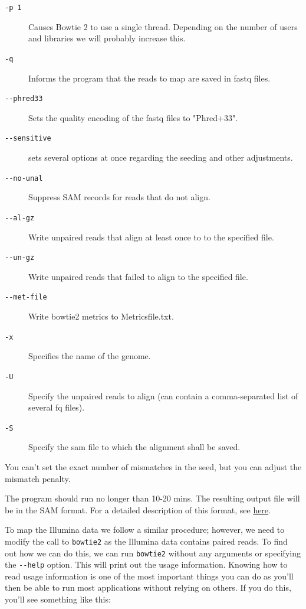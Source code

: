 \documentclass[11pt]{article}
\begin{document}
\begin{description}
\item[{\texttt{-p 1}}] Causes Bowtie 2 to use a single thread.
Depending on the number of users and libraries we will  probably increase this.
\item[{\texttt{-q}}] Informs the program that the reads to map are saved in fastq files.
\item[{\texttt{-{}-phred33}}] Sets the quality encoding of the fastq files to  "Phred+33".
\item[{\texttt{-{}-sensitive}}] sets several options at once regarding the seeding and other adjustments.
\item[{\texttt{-{}-no-unal}}] Suppress SAM records for reads that do not align.
\item[{\texttt{-{}-al-gz}}] Write unpaired reads that align at least once to to the specified file.
\item[{\texttt{-{}-un-gz}}] Write unpaired reads that failed to align to the specified file.
\item[{\texttt{-{}-met-file}}] Write bowtie2 metrics to Metricsfile.txt.
\item[{\texttt{-x}}] Specifies the name of the genome.
\item[{\texttt{-U}}] Specify the unpaired reads to align (can contain a comma-separated list of several fq files).
\item[{\texttt{-S}}] Specify the sam file to which the alignment shall be saved.
\end{description}

You can't set the exact number of mismatches in the seed, but you can
adjust the mismatch penalty.  

The program should run no longer than 10-20 mins. The resulting output file will be
in the SAM format. For a detailed description of this format, see \href{https://samtools.github.io/hts-specs/SAMv1.pdf}{here}.

To map the Illumina data we follow a similar procedure; however, we need to
modify the call to \texttt{bowtie2} as the Illumina data contains paired reads. To find
out how we can do this, we can run \texttt{bowtie2} without any arguments or
specifying the \texttt{-{}-help} option. This will
print out the usage information. Knowing how to read usage information is one
of the most important things you can do as you'll then be able to run most
applications without relying on others. If you do this, you'll see something
like this:
\end{document}
